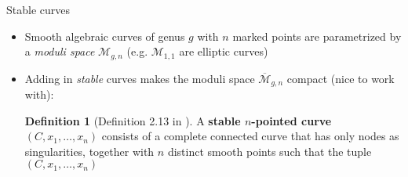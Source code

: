 \documentclass{beamer}
\theoremstyle{definition}
\newtheorem{dfn}[thm]{Definition}
\begin{document}
                                                                                                                                                                                                                      \begin{frame}{Stable curves}

                                                                                                                                                                                                                        \begin{itemize}

                                                                                                                                                                                                                        \item Smooth algebraic curves of genus $g$ with $n$ marked points
                                                                                                                                                                                                                          are parametrized by a {\it moduli space} $\mathcal M_{g,n}$ (e.g.
                                                                                                                                                                                                                          $\mathcal M_{1,1}$ are elliptic curves)
                                                                                                                                                                                                                        \item Adding in {\it stable} curves makes the moduli space $\overline{\mathcal M}_{g,n}$
                                                                                                                                                                                                                          compact (nice to work with):
                                                                                                                                                                                                                          \begin{dfn}[Definition 2.13 in \cite{Moduli}]
  A {\bf stable $n$-pointed curve} $(C,x_1,\dots,x_n)$ consists of
  a complete connected curve that has only nodes as singularities, together
  with $n$ distinct smooth points such that the tuple $(C,x_1,\dots,x_n)$

\end{dfn}
\end{itemize}
\end{frame}
\end{document}
